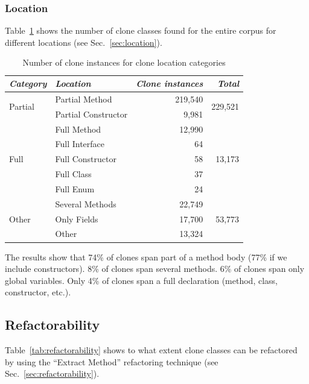 \documentclass[a4paper,UKenglish,cleveref, autoref, thm-restate,authorcolumns]{lipics-v2019}
\begin{document}
\subsubsection{Location}
Table~\ref{tab:location} shows the number of clone classes found for the entire corpus for different locations (see Sec.~\ref{sec:location}).

\begin{table}[H]
\centering
\begin{tabular}{@{}llrr@{}}
\toprule
\textit{\textbf{Category}} & \textit{\textbf{Location}} & \textit{\textbf{Clone instances}} & \textit{\textbf{Total}} \\ \midrule
\multirow{2}{*}{Partial} & Partial Method & 219,540 & \multirow{2}{*}{229,521} \\ \cmidrule(lr){2-3}
 & Partial Constructor & 9,981 &  \\ \midrule
\multirow{5}{*}{Full} & Full Method & 12,990 & \multirow{5}{*}{13,173} \\ \cmidrule(lr){2-3}
 & Full Interface & 64 &  \\ \cmidrule(lr){2-3}
 & Full Constructor & 58 &  \\ \cmidrule(lr){2-3}
 & Full Class & 37 &  \\ \cmidrule(lr){2-3}
 & Full Enum & 24 &  \\ \midrule
\multirow{3}{*}{Other} & Several Methods & 22,749 & \multirow{3}{*}{53,773} \\ \cmidrule(lr){2-3}
 & Only Fields & 17,700 &  \\ \cmidrule(lr){2-3}
 & Other & 13,324 &  \\ \bottomrule
\end{tabular}
\caption{Number of clone instances for clone location categories}
\label{tab:location}
\end{table}

The results show that 74\% of clones span part of a method body (77\% if we include constructors). 8\% of clones span several methods. 6\% of clones span only global variables. Only 4\% of clones span a full declaration (method, class, constructor, etc.).

\subsection{Refactorability}
Table~\ref{tab:refactorability} shows to what extent clone classes can be refactored by using the ``Extract Method'' refactoring technique (see Sec.~\ref{sec:refactorability}).
\end{document}
